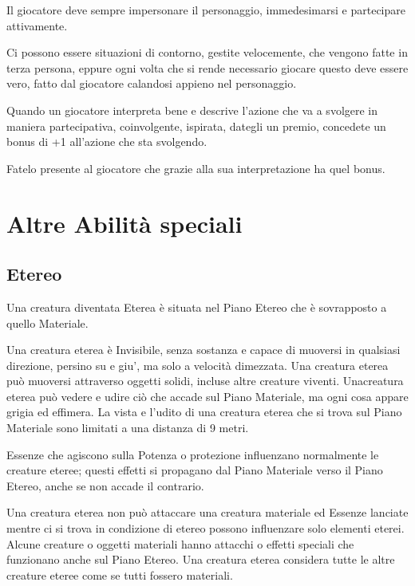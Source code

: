 \documentclass[a4paper,11pt,twoside,openany]{book}
\begin{document}
{Il giocatore deve sempre impersonare il personaggio, immedesimarsi e partecipare attivamente.

Ci possono essere situazioni di contorno, gestite velocemente, che vengono fatte in terza persona, eppure ogni volta che si rende necessario giocare questo deve essere vero, fatto dal giocatore calandosi appieno nel personaggio.

Quando un giocatore interpreta bene e descrive l'azione che va a svolgere in maniera partecipativa, coinvolgente, ispirata, dategli un premio, concedete un bonus di +1 all'azione che sta svolgendo.

Fatelo presente al giocatore che grazie alla sua interpretazione ha quel bonus.

\pagebreak

\section{Altre Abilità speciali}

\label{altre-abilita-speciali}

\subsection{Etereo}

\label{etereo}

Una creatura diventata Eterea è situata nel Piano Etereo che è sovrapposto a quello Materiale.

Una creatura eterea è Invisibile, senza sostanza e capace di muoversi in qualsiasi direzione, persino su e giu', ma solo a velocità dimezzata. Una creatura eterea può muoversi attraverso oggetti solidi, incluse altre creature viventi. Unacreatura eterea può vedere e udire ciò che accade sul Piano Materiale, ma ogni cosa appare grigia ed effimera. La vista e l'udito di una creatura eterea che si trova sul Piano Materiale sono limitati a una distanza di 9 metri.

Essenze che agiscono sulla Potenza o protezione influenzano normalmente le creature eteree; questi effetti si propagano dal Piano Materiale verso il Piano Etereo, anche se non accade il contrario.

Una creatura eterea non può attaccare una creatura materiale ed Essenze lanciate mentre ci si trova in condizione di etereo possono influenzare solo elementi eterei. Alcune creature o oggetti materiali hanno attacchi o effetti speciali che funzionano anche sul Piano Etereo. Una creatura eterea considera tutte le altre creature eteree come se tutti fossero materiali.


}
\end{document}

